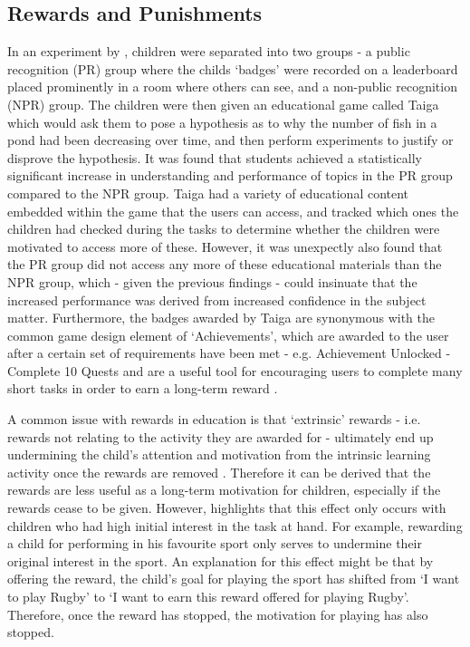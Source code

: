 \subsection{Rewards and Punishments}
In an experiment by \cite{Filsecker2014136}, children were separated into two groups - a public recognition (PR) group where the childs `badges' were recorded on a leaderboard placed prominently in a room where others can see, and a non-public recognition (NPR) group.
The children were then given an educational game called Taiga which would ask them to pose a hypothesis as to why the number of fish in a pond had been decreasing over time, and then perform experiments to justify or disprove the hypothesis.
It was found that students achieved a statistically significant increase in understanding and performance of topics in the PR group compared to the NPR group.
Taiga had a variety of educational content embedded within the game that the users can access, and tracked which ones the children had checked during the tasks to determine whether the children were motivated to access more of these. 
However, it was unexpectly also found that the PR group did not access any more of these educational materials than the NPR group, which - given the previous findings - could insinuate that the increased performance was derived from increased confidence in the subject matter. 
Furthermore, the badges awarded by Taiga are synonymous with the common game design element of `Achievements', which are awarded to the user after a certain set of requirements have been met - e.g. Achievement Unlocked - Complete 10 Quests and are a useful tool for encouraging users to complete many short tasks in order to earn a long-term reward \cite{hamari2011framework}.

A common issue with rewards in education is that `extrinsic' rewards - i.e. rewards not relating to the activity they are awarded for - ultimately end up undermining the child's attention and motivation from the intrinsic learning activity once the rewards are removed \citep{deci2001extrinsic,ACP:ACP2350090502}.
Therefore it can be derived that the rewards are less useful as a long-term motivation for children, especially if the rewards cease to be given.
However, \cite{cameron2001negative} highlights that this effect only occurs with children who had high initial interest in the task at hand. 
For example, rewarding a child for performing in his favourite sport only serves to undermine their original interest in the sport.
An explanation for this effect might be that by offering the reward, the child's goal for playing the sport has shifted from `I want to play Rugby' to `I want to earn this reward offered for playing Rugby'.
Therefore, once the reward has stopped, the motivation for playing has also stopped.

